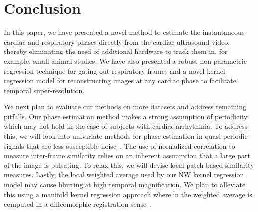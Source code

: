\documentclass[journal]{IEEEtran}
\begin{document}
\section{Conclusion}
\label{sec:conclusion}
%
In this paper, we have presented a novel method to estimate the instantaneous cardiac and respiratory phases directly from the cardiac ultrasound video, thereby eliminating the need of additional hardware to track them in, for example, small animal studies. We have also presented a robust non-parametric regression technique for gating out respiratory frames and a novel kernel regression model for reconstructing images at any cardiac phase to facilitate temporal super-resolution. 

	We next plan to evaluate our methods on more datasets and address remaining pitfalls. Our phase estimation method makes a strong assumption of periodicity which may not hold in the case of subjects with cardiac arrhythmia. To address this, we will look into univariate methods for phase estimation in quasi-periodic signals that are less susceptible noise~\cite{Luo2003,Lu2013}. The use of normalized correlation to measure inter-frame similarity relies on an inherent assumption that a large part of the image is pulsating. To relax this, we will devise local patch-based similarity measures. Lastly, the local weighted average used by our NW kernel regression model may cause blurring at high temporal magnification. We plan to alleviate this using a manifold kernel regression approach where in the weighted average is computed in a diffeomorphic registration sense~\cite{Davis2010}.
%
\end{document}
